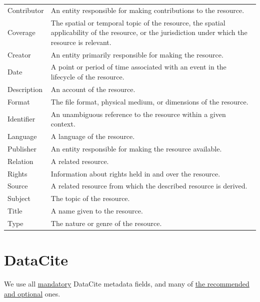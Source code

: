\documentclass[
  a4paper,
  openany, a4paper, oneside]{book}
\begin{document}
\begin{longtable}[]{@{}
  >{\raggedright\arraybackslash}p{}
  >{\centering\arraybackslash}p{}@{}}
\toprule
& \\
\midrule
\endhead
Contributor & An entity responsible for making contributions to the resource. \\
Coverage & The spatial or temporal topic of the resource, the spatial applicability of the resource, or the jurisdiction under which the resource is relevant. \\
Creator & An entity primarily responsible for making the resource. \\
Date & A point or period of time associated with an event in the lifecycle of the resource. \\
Description & An account of the resource. \\
Format & The file format, physical medium, or dimensions of the resource. \\
Identifier & An unambiguous reference to the resource within a given context. \\
Language & A language of the resource. \\
Publisher & An entity responsible for making the resource available. \\
Relation & A related resource. \\
Rights & Information about rights held in and over the resource. \\
Source & A related resource from which the described resource is derived. \\
Subject & The topic of the resource. \\
Title & A name given to the resource. \\
Type & The nature or genre of the resource. \\
\bottomrule
\end{longtable}

\hypertarget{DataCite}{%
\section{DataCite}\label{DataCite}}

We use all \href{https://support.datacite.org/docs/datacite-metadata-schema-v44-mandatory-properties}{mandatory} DataCite metadata fields, and many of \href{https://support.datacite.org/docs/datacite-metadata-schema-v44-recommended-and-optional-properties}{the recommended and optional} ones.
\end{document}

